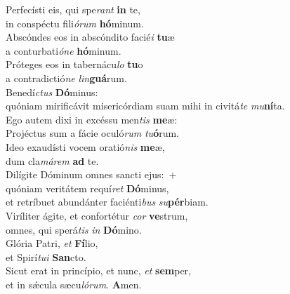 \evenverse Perfecísti eis, qui spe\textit{rant} \textbf{in} te,~\*\\
\evenverse in conspéctu fili\textit{ó}\textit{rum} \textbf{hó}minum.\\
\oddverse Abscóndes eos in abscóndito facié\textit{i} \textbf{tu}æ~\*\\
\oddverse a conturbati\textit{ó}\textit{ne} \textbf{hó}minum.\\
\evenverse Próteges eos in tabernácu\textit{lo} \textbf{tu}o~\*\\
\evenverse a contradictió\textit{ne} \textit{lin}\textbf{guá}rum.\\
\oddverse Benedí\textit{ctus} \textbf{Dó}minus:~\*\\
\oddverse quóniam mirificávit misericórdiam suam mihi in civitá\textit{te} \textit{mu}\textbf{ní}ta.\\
\evenverse Ego autem dixi in excéssu men\textit{tis} \textbf{me}æ:~\*\\
\evenverse Projéctus sum a fácie oculó\textit{rum} \textit{tu}\textbf{ó}rum.\\
\oddverse Ideo exaudísti vocem oratió\textit{nis} \textbf{me}æ,~\*\\
\oddverse dum cla\textit{má}\textit{rem} \textbf{ad} te.\\
\evenverse Dilígite Dóminum omnes sancti ejus:~+\\
\evenverse  quóniam veritátem requí\textit{ret} \textbf{Dó}minus,~\*\\
\evenverse et retríbuet abundánter faciénti\textit{bus} \textit{su}\textbf{pér}biam.\\
\oddverse Viríliter ágite, et confortétur \textit{cor} \textbf{ve}strum,~\*\\
\oddverse omnes, qui sperá\textit{tis} \textit{in} \textbf{Dó}mino.\\
\evenverse Glória Patri, \textit{et} \textbf{Fí}lio,~\*\\
\evenverse et Spirí\textit{tu}\textit{i} \textbf{San}cto.\\
\oddverse Sicut erat in princípio, et nunc, \textit{et} \textbf{sem}per,~\*\\
\oddverse et in sǽcula sæcu\textit{ló}\textit{rum}. \textbf{A}men.\\
